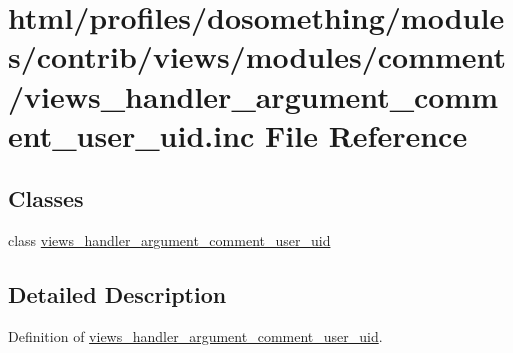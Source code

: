 \hypertarget{views__handler__argument__comment__user__uid_8inc}{
\section{html/profiles/dosomething/modules/contrib/views/modules/comment/views\_\-handler\_\-argument\_\-comment\_\-user\_\-uid.inc File Reference}
\label{views__handler__argument__comment__user__uid_8inc}
}
\subsection*{Classes}
\begin{DoxyCompactItemize}
\item 
class \hyperlink{classviews__handler__argument__comment__user__uid}{views\_\-handler\_\-argument\_\-comment\_\-user\_\-uid}
\end{DoxyCompactItemize}


\subsection{Detailed Description}
Definition of \hyperlink{classviews__handler__argument__comment__user__uid}{views\_\-handler\_\-argument\_\-comment\_\-user\_\-uid}. 